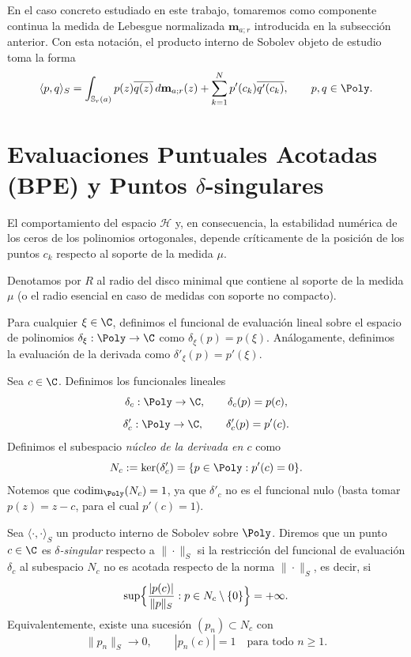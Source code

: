 En el caso concreto estudiado en este trabajo, tomaremos como componente continua la medida de Lebesgue normalizada $\mathbf{m}_{a;r}$ introducida en la subsección anterior. Con esta notación, el producto interno de Sobolev objeto de estudio toma la forma
\begin{equation} \label{eq:sobolev_concreto}
	\langle p, q \rangle_S = \int_{\mathbb{S}_r(a)} p(z)\overline{q(z)} \, d\mathbf{m}_{a;r}(z) + \sum_{k=1}^N p'(c_k)\overline{q'(c_k)}, \qquad p, q \in \Poly.
\end{equation}

\section{Evaluaciones Puntuales Acotadas (BPE) y Puntos $\delta$-singulares}

El comportamiento del espacio $\mathcal{H}$ y, en consecuencia, la estabilidad numérica de los ceros de los polinomios ortogonales, depende críticamente de la posición de los puntos $c_k$ respecto al soporte de la medida $\mu$.

Denotamos por $R$ al radio del disco minimal que contiene al soporte de la medida $\mu$ (o el radio esencial en caso de medidas con soporte no compacto).

\begin{defn}
	Para cualquier $\xi \in \C$, definimos el funcional de evaluación lineal sobre el espacio de polinomios $\delta_\xi : \Poly \to \C$ como $\delta_\xi(p) = p(\xi)$. Análogamente, definimos la evaluación de la derivada como $\delta'_\xi(p) = p'(\xi)$.
\end{defn}

\begin{defn}\label{def:funcionales_restringidos}
	Sea $c\in\C$. Definimos los funcionales lineales
	\[
		\delta_c:\Poly\to\C,\qquad \delta_c(p)=p(c),
	\]
	\[
		\delta'_c:\Poly\to\C,\qquad \delta'_c(p)=p'(c).
	\]
	Definimos el subespacio \emph{núcleo de la derivada en $c$} como
	\[
		N_c:=\ker(\delta'_c)=\{p\in\Poly:p'(c)=0\}.
	\]
	Notemos que $\operatorname{codim}_{\Poly}(N_c)=1$, ya que $\delta'_c$ no es el funcional nulo
	(basta tomar $p(z)=z-c$, para el cual $p'(c)=1$).
\end{defn}

\begin{defn}\label{def:delta_singular}
	Sea $\langle\cdot,\cdot\rangle_S$ un producto interno de Sobolev sobre $\Poly$.
	Diremos que un punto $c\in\C$ es \emph{$\delta$-singular} respecto a
	$\|\cdot\|_S$ si la restricción del funcional de evaluación
	$\delta_c$ al subespacio $N_c$ no es acotada respecto de la norma
	$\|\cdot\|_S$, es decir, si
	\[
		\sup\Bigl\{\frac{|p(c)|}{\|p\|_S}:p\in N_c\setminus\{0\}\Bigr\}
		=+\infty.
	\]
	Equivalentemente, existe una sucesión $(p_n)\subset N_c$ con
	\[
		\|p_n\|_S\to 0,\qquad |p_n(c)|=1\quad\text{para todo }n\ge1.
	\]
\end{defn}

